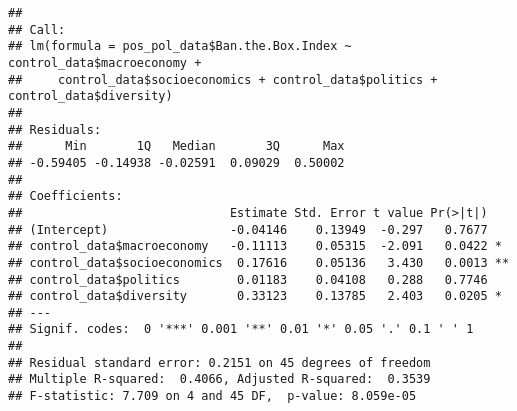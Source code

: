 \documentclass[
]{article}
\newenvironment{Shaded}{\begin{snugshade}}{\end{snugshade}}
\newcommand{\CommentTok}[1]{\textcolor[rgb]{0.56,0.35,0.01}{\textit{#1}}}
\newcommand{\FunctionTok}[1]{\textcolor[rgb]{0.13,0.29,0.53}{\textbf{#1}}}
\newcommand{\NormalTok}[1]{#1}
\newcommand{\OtherTok}[1]{\textcolor[rgb]{0.56,0.35,0.01}{#1}}
\newcommand{\SpecialCharTok}[1]{\textcolor[rgb]{0.81,0.36,0.00}{\textbf{#1}}}
\begin{document}
\begin{Shaded}
\end{Shaded}

\begin{verbatim}
## 
## Call:
## lm(formula = pos_pol_data$Ban.the.Box.Index ~ control_data$macroeconomy + 
##     control_data$socioeconomics + control_data$politics + control_data$diversity)
## 
## Residuals:
##      Min       1Q   Median       3Q      Max 
## -0.59405 -0.14938 -0.02591  0.09029  0.50002 
## 
## Coefficients:
##                             Estimate Std. Error t value Pr(>|t|)   
## (Intercept)                 -0.04146    0.13949  -0.297   0.7677   
## control_data$macroeconomy   -0.11113    0.05315  -2.091   0.0422 * 
## control_data$socioeconomics  0.17616    0.05136   3.430   0.0013 **
## control_data$politics        0.01183    0.04108   0.288   0.7746   
## control_data$diversity       0.33123    0.13785   2.403   0.0205 * 
## ---
## Signif. codes:  0 '***' 0.001 '**' 0.01 '*' 0.05 '.' 0.1 ' ' 1
## 
## Residual standard error: 0.2151 on 45 degrees of freedom
## Multiple R-squared:  0.4066, Adjusted R-squared:  0.3539 
## F-statistic: 7.709 on 4 and 45 DF,  p-value: 8.059e-05
\end{verbatim}
\end{document}
